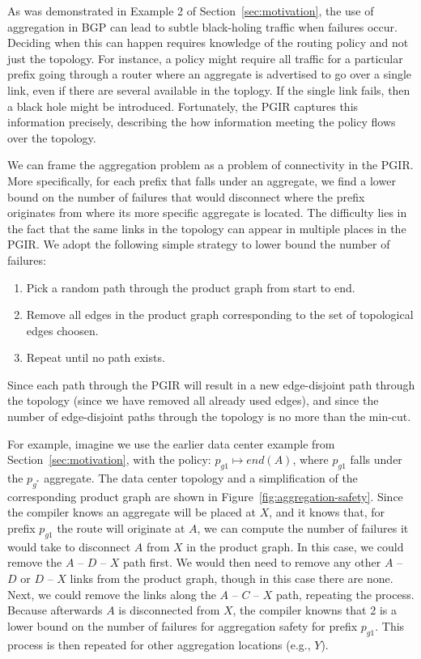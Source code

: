 As was demonstrated in Example 2 of Section~\ref{sec:motivation}, the use of aggregation in BGP can lead to subtle black-holing traffic when failures occur. Deciding when this can happen requires knowledge of the routing policy and not just the topology. For instance, a policy might require all traffic for a particular prefix going through a router where an aggregate is advertised to go over a single link, even if there are several available in the toplogy. If the single link fails, then a black hole might be introduced. Fortunately, the PGIR captures this information precisely, describing the how information meeting the policy flows over the topology.

We can frame the aggregation problem as a problem of connectivity in the PGIR. More specifically, for each prefix that falls under an aggregate, we find a lower bound on the number of failures that would disconnect where the prefix originates from where its more specific aggregate is located. The difficulty lies in the fact that the same links in the topology can appear in multiple places in the PGIR. We adopt the following simple strategy to lower bound the number of failures:
\begin{enumerate}
	\item Pick a random path through the product graph from start to end.
	\item Remove all edges in the product graph corresponding to the set of topological edges choosen.
	\item Repeat until no path exists.
\end{enumerate}
Since each path through the PGIR will result in a new edge-disjoint path through the topology (since we have removed all already used edges), and since the number of edge-disjoint paths through the topology is no more than the min-cut. 

For example, imagine we use the earlier data center example from Section~\ref{sec:motivation}, with the policy: $p_{g1} \mapsto end(A)$, where $p_{g1}$ falls under the $p_{g^*}$ aggregate. The data center topology and a simplification of the corresponding product graph are shown in Figure~\ref{fig:aggregation-safety}. Since the compiler knows an aggregate will be placed at $X$, and it knows that, for prefix $p_{g1}$ the route will originate at $A$, we can compute the number of failures it would take to disconnect $A$ from $X$ in the product graph. In this case, we could remove the $A$ -- $D$ -- $X$ path first. We would then need to remove any other $A$ -- $D$ or $D$ -- $X$ links from the product graph, though in this case there are none. Next, we could remove the links along the $A$ -- $C$ -- $X$ path, repeating the process. Because afterwards $A$ is disconnected from $X$, the compiler knowns that 2 is a lower bound on the number of failures for aggregation safety for prefix $p_{g1}$. This process is then repeated for other aggregation locations (e.g., $Y$).


